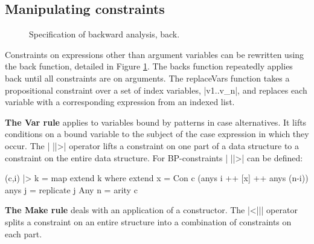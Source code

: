 \documentclass[preprint]{sigplanconf}
\newcommand{\C}[1]{\textsf{#1}}
\newcommand{\para}[1]{\vspace{2mm}\noindent\textbf{#1}}
\newcommand{\ignore}{}
\begin{document}
\subsection{Manipulating constraints}
\label{sec:backward}

\begin{figure}
\caption{Specification of backward analysis, \C{back}.}
\label{fig:backward}
\end{figure}

Constraints on expressions other than argument variables can be rewritten using the \C{back} function, detailed in Figure \ref{fig:backward}. The \C{backs} function repeatedly applies \C{back} until all constraints are on arguments. The \C{replaceVars} function takes a propositional constraint over a set of index variables, \ignore|v1..v_n|, and replaces each variable with a corresponding expression from an indexed list.

\para{The \C{Var} rule} applies to variables bound by patterns in case alternatives. It lifts conditions on a bound variable to the subject of the case expression in which they occur. The | ||>| operator lifts a constraint on one part of a data structure to a constraint on the entire data structure. For BP-constraints | ||>| can be defined:

\begin{code}
(c,i) |> k = map extend k
    where
    extend x = Con c (anys i ++ [x] ++ anys (n-i))
    anys j = replicate j Any
    n = arity c
\end{code}

\para{The \C{Make} rule} deals with an application of a constructor. The |<||| operator splits a constraint on an entire structure into a combination of constraints on each part.
\end{document}
